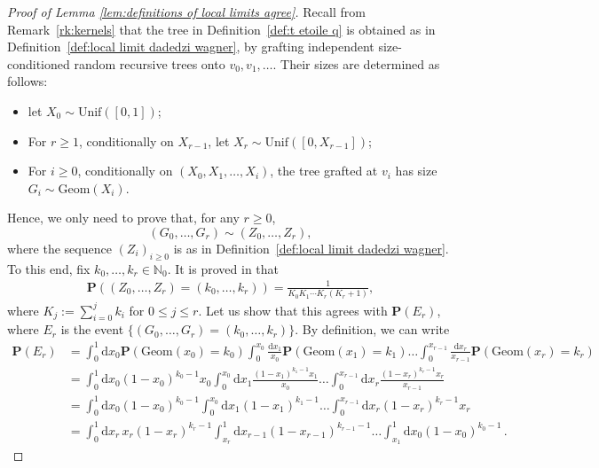 \documentclass{article}
\theoremstyle{remark}
\newcommand{\prob}[1]{\mathbf{P}{\left(#1\right)}}
\newcommand{\Unif}[1]{\mathrm{Unif}{\left(#1\right)}}
\begin{document}
\begin{proof}[Proof of Lemma \ref{lem:definitions of local limits agree}]
Recall from Remark~\ref{rk:kernels} that the tree in Definition~\ref{def:t etoile q} is obtained as in Definition~\ref{def:local limit dadedzi wagner}, by grafting independent size-conditioned random recursive trees onto $v_0,v_1,\ldots$. 
Their sizes are determined as follows:
\begin{itemize}
    \item let $X_0 \sim \Unif{[0,1]}$;
    \item For $r \geq 1$, conditionally on $X_{r-1}$, let $X_r \sim \Unif{[0,X_{r-1}]}$;
    \item For $i \geq 0$, conditionally on $(X_0,X_1,\ldots,X_i)$, the tree grafted at $v_i$ has size $G_i \sim \mathrm{Geom}(X_i)$.
\end{itemize}
Hence, we only need to prove that, for any $r \geq 0$,
\begin{equation}
(G_0,\ldots,G_r) \sim (Z_0,\ldots,Z_r),
\end{equation}
where the sequence $(Z_i)_{i \geq 0}$ is as in Definition~\ref{def:local limit dadedzi wagner}.
To this end, fix $k_0, \ldots, k_r \in \mathbb{N}_0$. It is proved in \cite[Proof of Theorem A.1]{Dadedzi_Wagner_2024} that
\begin{align*}
    \prob{(Z_0,\ldots,Z_r)=(k_0,\ldots,k_r)} = \frac{1}{K_0 K_1 \cdots K_r(K_r+1)},
\end{align*}
where $K_j := \sum_{i=0}^j k_i$ for $0 \leq j \leq r$.
Let us show that this agrees with $\prob{E_r}$, where $E_r$ is the event $\{(G_0,\ldots,G_r)=(k_0,\ldots,k_r)\}$. 
By definition, we can write
\begin{align*}
\prob{E_r}&= \int_0^1 \mathrm dx_0 \prob{\mathrm{Geom}(x_0)=k_0} 
\int_0^{x_0} \frac{\mathrm dx_1}{x_0} \prob{\mathrm{Geom}(x_1)=k_1}
\ldots
\int_0^{x_{r-1}} \frac{\mathrm dx_r}{x_{r-1}} \prob{\mathrm{Geom}(x_r)=k_r} \\
&= \int_0^1 \mathrm dx_0 (1-x_0)^{k_0-1} x_0 
\int_0^{x_0} \mathrm dx_1 \frac{(1-x_1)^{k_1-1} x_1}{x_0} 
\ldots
\int_0^{x_{r-1}} \mathrm dx_r \frac{(1-x_r)^{k_r-1} x_r}{x_{r-1}} \\
&= \int_0^1 \mathrm dx_0 (1-x_0)^{k_0-1} 
\int_0^{x_0} \mathrm dx_1 (1-x_1)^{k_1-1} 
\ldots 
\int_0^{x_{r-1}} \mathrm dx_r (1-x_r)^{k_r-1} x_r \\
&= \int_0^1 \mathrm dx_r\, x_r(1-x_r)^{k_r-1}  
\int_{x_r}^1 \mathrm dx_{r-1} (1-x_{r-1})^{k_{r-1}-1}  
\ldots 
\int_{x_1}^1 \mathrm dx_0 (1-x_0)^{k_0-1} \,.
\end{align*}

\end{proof}
\end{document}
